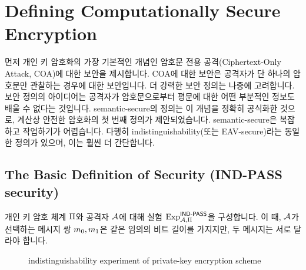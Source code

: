 \section{Defining Computationally Secure Encryption}

먼저 개인 키 암호화의 가장 기본적인 개념인 암호문 전용 공격(Ciphertext-Only
Attack, COA)에 대한 보안을 제시합니다. COA에 대한 보안은 공격자가 단 하나의
암호문만 관찰하는 경우에 대한 보안입니다. 더 강력한 보안 정의는 나중에
고려합니다. 보안 정의의 아이디어는 공격자가 암호문으로부터 평문에 대한 어떤
부분적인 정보도 배울 수 없다는 것입니다. semantic-secure의 정의는 이 개념을
정확히 공식화한 것으로, 계산상 안전한 암호화의 첫 번째 정의가 제안되었습니다.
semantic-secure은 복잡하고 작업하기가 어렵습니다. 다행히
indistinguishability(또는 EAV-secure)라는 동일한 정의가 있으며, 이는 훨씬 더
간단합니다.

\subsection*{The Basic Definition of Security (IND-PASS security)}

개인 키 암호 체계 $\Pi$와 공격자 $\mathcal{A}$에 대해 실험 $\text{Exp}^{\textsf{IND-PASS}}_{\mathcal{A}, \Pi}$을
구성합니다. 이 때, $\mathcal{A}$가 선택하는 메시지 쌍 $m_0, m_1$은 같은 임의의 비트 길이를 가지지만, 두 메시지는 서로
달라야 합니다.

\begin{figure}[ht]
  \centering
  \caption{indistinguishability experiment of private-key encryption scheme}
  \label{fig:exp_ind_pass}
\end{figure}

